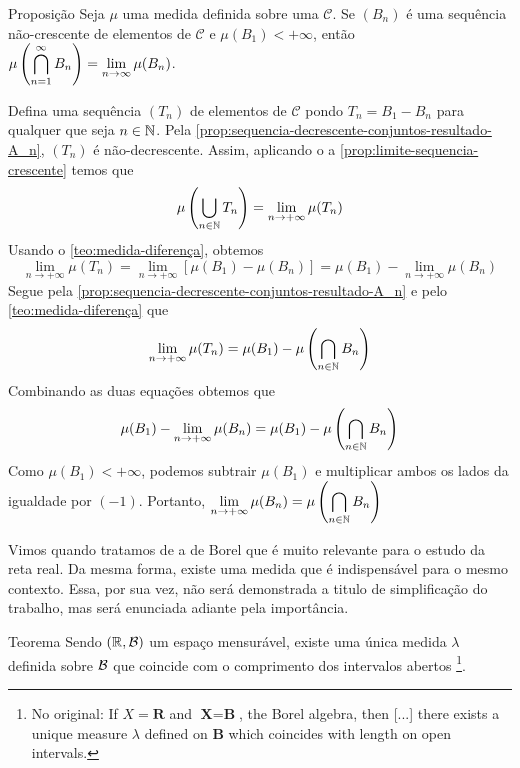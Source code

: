 \begin{env}{Proposição}
Seja $\mu$ uma medida definida sobre uma \sigal $\mathcal{C}$.
Se $(B_n)$ é uma sequência não-crescente de elementos de $\mathcal{C}$ e $\mu(B_1) < +\infty$, então 
$\mu\left(\displaystyle \bigcap_{n = 1}^\infty B_n\right) = \displaystyle \lim_{n \to \infty} \mu(B_n)$.
\end{env} 
\begin{prova}
    Defina uma sequência $(T_n)$ de elementos de $\mathcal{C}$ pondo $T_n = B_1 - B_n$ para qualquer que seja $n \in \operatorname{\mathbb{N}}$.
    Pela \ref{prop:sequencia-decrescente-conjuntos-resultado-A_n}, $(T_n)$ é não-decrescente.
    Assim, aplicando o a \ref{prop:limite-sequencia-crescente} temos que 
    $$
    \mu\left(\bigcup_{n \in \operatorname{\mathbb{N}}} T_n\right) = \lim_{n \to +\infty} \mu(T_n)
    $$
    Usando o \ref{teo:medida-diferença}, obtemos
    $$
    \lim_{n \to +\infty} \mu(T_n) = \lim_{n \to +\infty} [\mu(B_1) - \mu(B_n)] = \mu(B_1) - \lim_{n \to +\infty} \mu(B_n)
    $$
    Segue pela \ref{prop:sequencia-decrescente-conjuntos-resultado-A_n} e pelo \ref{teo:medida-diferença} que 
    $$
    \lim_{n \to +\infty} \mu(T_n) = \mu(B_1) - \mu\left(\bigcap_{n \in \operatorname{\mathbb{N}}} B_n\right)
    $$
    Combinando as duas equações obtemos que
    \begin{align*}
        \mu(B_1) - \lim_{n \to +\infty} \mu(B_n) = \mu(B_1) - \mu\left(\bigcap_{n \in \operatorname{\mathbb{N}}} B_n\right)
    \end{align*}
    Como $\mu(B_1) < +\infty$, podemos subtrair $\mu(B_1)$ e multiplicar ambos os lados da igualdade por $(-1)$.
    Portanto, $\displaystyle \lim_{n \to +\infty} \mu(B_n) = \mu\left(\bigcap_{n \in \operatorname{\mathbb{N}}} B_n\right)$
\end{prova}

Vimos quando tratamos de \sigals a \sigal de Borel que é muito relevante para o estudo da reta real.
Da mesma forma, existe uma medida que é indispensável para o mesmo contexto.
Essa, por sua vez, não será demonstrada a titulo de simplificação do trabalho, mas será enunciada adiante pela importância. 
\begin{env}{Teorema}
	\label{teo: medida de lebesgue}
	Sendo $(\mathbb{R}, \operatorname{\mathcal{B}})$ um espaço mensurável, existe uma única medida $\lambda$ definida sobre $\operatorname{\mathcal{B}}$ que coincide com o comprimento dos intervalos abertos \cite[p.20, tradução nossa, adaptação nossa]{bartle}
	\footnote{No original: If $X = \textbf{R}$ and $\textbf{X} = \textbf{B}$, the Borel algebra, then [...] there exists a unique measure $\lambda$ defined on $\textbf{B}$ which coincides with length on open intervals.}.
\end{env}

